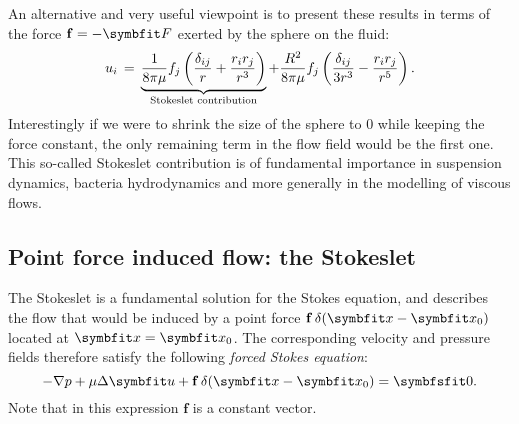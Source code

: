 An alternative and very useful viewpoint is to present these results in terms of the force $\mathbf f=-\bF$ exerted by the sphere on the fluid:
\begin{equation}
u_i \,=\, \underbrace{\frac{1}{8 \pi\mu}f_j\left(\frac{\delta_{ij}}{r}+\frac{r_ir_j}{r^3}\right)}_\text{Stokeslet contribution} +\frac{R^2}{8\pi\mu}f_j\left(\frac{\delta_{ij}}{3r^3}-\frac{r_ir_j}{r^5}\right).
\label{eq:stokes_force_sphere}
\end{equation}
Interestingly if we were to shrink the size of the sphere to 0 while keeping the force constant, the only remaining term in the flow field would be the first one. This so-called Stokeslet contribution is of fundamental importance in suspension dynamics, bacteria hydrodynamics and more generally in the modelling of viscous flows.
\subsection{Point force induced flow: the Stokeslet}
The Stokeslet is a fundamental solution for the Stokes equation, and describes the flow that would be induced by a point force $\mathbf f\, \delta(\bx-\bx_0)$ located at $\bx = \bx_0$. The corresponding velocity and pressure fields therefore satisfy the following \textit{forced Stokes equation}:
\begin{equation}
-\nabla p + \mu \Delta \bu + \mathbf f \,\delta(\bx-\bx_0) = \symbfsfit 0.
\label{eq:forced_stokes_equation}
\end{equation}
Note that in this expression $\mathbf f$ is a constant vector. 

